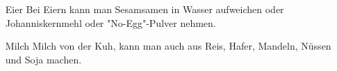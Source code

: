 \begin{enumerate}
	\item[Eier] Bei Eiern kann man Sesamsamen in Wasser aufweichen oder Johanniskernmehl oder "No-Egg"-Pulver nehmen. 
	\item[Milch]  Milch von der Kuh, kann man auch aus Reis, Hafer, Mandeln, Nüssen und Soja machen. 
\end{enumerate}